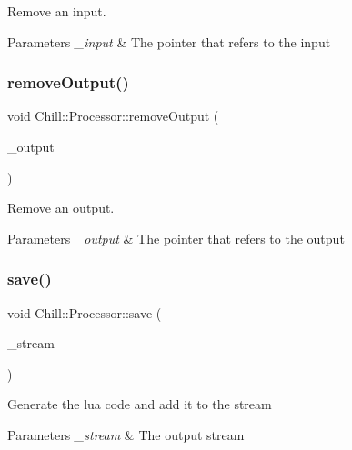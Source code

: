 Remove an input. 
\begin{DoxyParams}{Parameters}
{\em \+\_\+input} & The pointer that refers to the input \\
\hline
\end{DoxyParams}
\mbox{\label{class_chill_1_1_processor_adf8c383a1b90606599e42c85f12ea7cd}} 
\subsubsection{\texorpdfstring{remove\+Output()}{removeOutput()}}
{\footnotesize\ttfamily void Chill\+::\+Processor\+::remove\+Output (\begin{DoxyParamCaption}\item[{Auto\+Ptr$<$ \mbox{\hyperlink{class_chill_1_1_processor_output}{Processor\+Output}} $>$ \&}]{\+\_\+output }\end{DoxyParamCaption})}

Remove an output. 
\begin{DoxyParams}{Parameters}
{\em \+\_\+output} & The pointer that refers to the output \\
\hline
\end{DoxyParams}
\mbox{\label{class_chill_1_1_processor_a476a6eddddef2f44827e4d9de530d706}} 
\subsubsection{\texorpdfstring{save()}{save()}}
{\footnotesize\ttfamily void Chill\+::\+Processor\+::save (\begin{DoxyParamCaption}\item[{std\+::ofstream \&}]{\+\_\+stream }\end{DoxyParamCaption})\hspace{0.3cm}{\ttfamily [virtual]}}

Generate the lua code and add it to the stream 
\begin{DoxyParams}{Parameters}
{\em \+\_\+stream} & The output stream \\
\hline
\end{DoxyParams}


